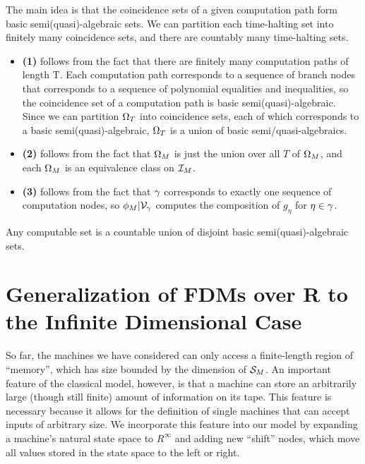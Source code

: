   \begin{proofsketch}
    
    The main idea is that the coincidence sets of a given computation
    path form basic semi(quasi)-algebraic sets.  We can partition
    each time-halting set into finitely many coincidence sets, and
    there are countably many time-halting sets.

    \begin{itemize}
    \item \textbf{(1)} follows from the fact that there are finitely
      many computation paths of length T.  Each computation path
      corresponds to a sequence of branch nodes that corresponds to a
      sequence of polynomial equalities and inequalities, so the
      coincidence set of a computation path is basic
      semi(quasi)-algebraic. Since we can partition $\Omega_T$ into
      coincidence sets, each of which corresponds to a basic
      semi(quasi)-algebraic, $\Omega_T$ is a union of basic
      semi/quasi-algebraics.
    \item \textbf{(2)} follows from the fact that $\Omega_M$ is just
      the union over all $T$ of $\Omega_M$, and each $\Omega_M$ is
      an equivalence class on $\mathcal{I}_M$.
    \item \textbf{(3)} follows from the fact that $\gamma$
      corresponds to exactly one sequence of computation nodes, so
      $\phi_M|\mathcal{V}_{\gamma}$ computes the composition of
      $g_{\eta}$ for $\eta \in \gamma$.
    \end{itemize}
  \end{proofsketch}
  
  \begin{corollary}
    Any computable set is a countable union of disjoint basic
    semi(quasi)-algebraic sets.
  \end{corollary}

  \section{Generalization of FDMs over R to the Infinite Dimensional Case}

  So far, the machines we have considered can only access a
  finite-length region of ``memory'', which has size bounded by the
  dimension of $\mathcal{S}_M$.  An important feature of the classical
  model, however, is that a machine can store an arbitrarily large
  (though still finite) amount of information on its tape.  This
  feature is necessary because it allows for the definition of single
  machines that can accept inputs of arbitrary size. We incorporate
  this feature into our model by expanding a machine's natural state
  space to $R^\infty$ and adding new ``shift'' nodes, which move all
  values stored in the state space to the left or right.


